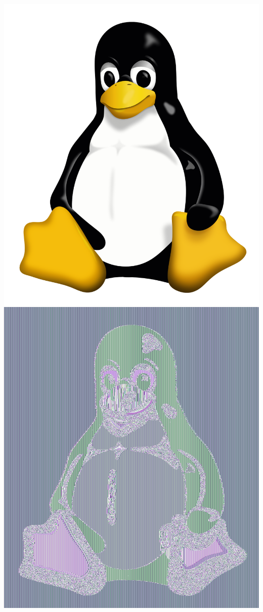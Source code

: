 \documentclass[10pt,letterpaper]{article}
\begin{document}
\includegraphics[scale=.1]{Tux.png}
\includegraphics[scale=.1]{ecbtux.png}
\end{document}
